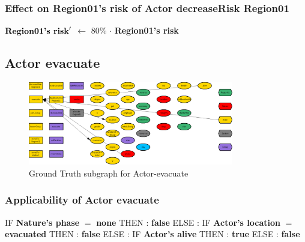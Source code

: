 \documentclass{article}%
\begin{document}
%
\subsubsection{Effect on Region01's risk of Actor decreaseRisk Region01}%
\label{ssubsec:Effect on Region01's risk of Actor decreaseRisk Region01}%
\begin{flushleft}%
$\mbox{\textbf{Region01's risk}} '$%
$\leftarrow$%
80\%%
$\cdot$%
\textbf{Region01's risk}%
\end{flushleft}

%
\subsection{Actor evacuate}%
\label{subsec:Actor evacuate}%


\begin{figure}[ht]%
\centering%
\includegraphics[width=0.8\textwidth]{images/Actor-evacuate.png}%
\caption{Ground Truth subgraph for Actor{-}evacuate}%
\end{figure}

%
\subsubsection{Applicability of Actor evacuate}%
\label{ssubsec:Applicability of Actor evacuate}%
\begin{flushleft}%
IF %
\textbf{Nature's phase}%
$=$%
\textbf{none}%
\linebreak%
\hspace*{2em}%
THEN %
: %
\textbf{false}%
\linebreak%
\hspace*{2em}%
ELSE %
: %
IF %
\textbf{Actor's location}%
$=$%
\textbf{evacuated}%
\linebreak%
\hspace*{4em}%
THEN %
: %
\textbf{false}%
\linebreak%
\hspace*{4em}%
ELSE %
: %
IF %
\textbf{Actor's alive}%
\linebreak%
\hspace*{6em}%
THEN %
: %
\textbf{true}%
\linebreak%
\hspace*{6em}%
ELSE %
: %
\textbf{false}%
\end{flushleft}
\end{document}
